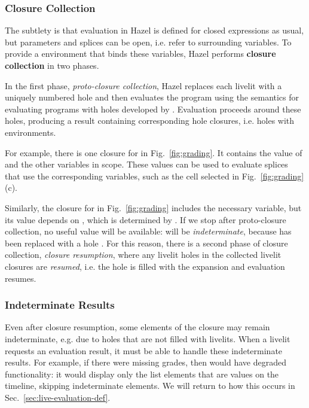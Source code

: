 \subsubsection{Closure Collection} The subtlety is that 
evaluation in Hazel is defined for closed expressions as usual,
but parameters and splices can be open, i.e. refer to surrounding variables. 
To provide a environment that binds these variables, 
Hazel performs \textbf{closure collection} in two phases.

In the first phase, \emph{proto-closure collection}, 
Hazel replaces each livelit with a uniquely numbered hole and then evaluates the program 
using the semantics for evaluating programs with holes developed by \citet{HazelnutLive}.
Evaluation proceeds around these holes, producing a result containing 
corresponding hole closures, i.e. holes with environments.

For example, there is one closure for  in Fig.~\ref{fig:grading}.
It contains the value of  and the other variables in scope. 
These values can be used to evaluate 
splices that use the corresponding variables, such as the cell selected in Fig.~\ref{fig:grading}(c). 

Similarly, the closure for  in Fig.~\ref{fig:grading} includes 
the necessary  variable, but 
its value depends on , which is determined by . 
If we stop after proto-closure collection,
no useful value will be available:
 will be \emph{indeterminate}, because  has been replaced with a hole \cite{HazelnutLive}.
For this reason, there is a second phase of closure collection, \emph{closure resumption}, 
where any livelit holes 
in the collected livelit closures are \emph{resumed}, i.e. the hole is filled with the expansion 
 and evaluation resumes.


\subsubsection{Indeterminate Results}
Even after closure resumption, some elements of the closure may remain indeterminate, e.g. due to holes that 
are not filled with livelits. 
When a livelit requests an evaluation result, it must be able to handle these indeterminate results.
For example, if there were missing grades,
then  would have degraded functionality: 
it would display only the list elements that are values on the timeline, skipping indeterminate elements.
We will return to how this occurs in Sec.~\ref{sec:live-evaluation-def}.



